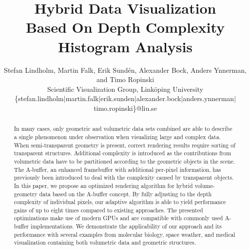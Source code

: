 \documentclass{egpubl}
\title[Hybrid Data Visualization]%
      {Hybrid Data Visualization\\ Based On Depth Complexity Histogram Analysis}
\author[S.~Lindholm et al.]%
{Stefan Lindholm, Martin Falk, Erik Sund\'en, Alexander Bock,
  Anders Ynnerman, and Timo Ropinski\\
  Scientific Visualization Group, Link{\"o}ping University\\
  \{stefan.lindholm$|$martin.falk$|$erik.sunden$|$alexander.bock$|$anders.ynnerman$|$timo.ropinski\}@liu.se%
}
\newcommand{\ab}{\mbox{A-buffer}}
\newlength{\imgWidth}
\newif\ifSplitBoxFramed
\newcommand{\splitImage}[2]{%
  \begin{tikzpicture}[x=\imgWidth,y=-\imgWidth] %
    \clip (0,0) rectangle (1,1);
    \begin{scope}[]
      \clip (0,0) -- (\topLineRatio,0) -- (\bottomLineRatio,1) -- (0,1);
      \draw(0,0) node[anchor=north west,inner sep=0pt]{%
        \texttt{[image: \#1]}};
    \end{scope}
    \begin{scope}[]
      \clip  (\topLineRatio,0) -- (\bottomLineRatio,1) -- (1,1) -- (1,0);
      \draw(0,0) node[anchor=north west,inner sep=0pt]{%
        \texttt{[image: \#2]}};
    \end{scope}
    \draw[black,very thick] (\topLineRatio,0) -- (\bottomLineRatio,1) ;
    \ifSplitBoxFramed%
      \draw[line width=1pt] (0,0) rectangle (1,1);
    \fi
  \end{tikzpicture}
}
\newcommand{\goldenRatioLong}{0.618}
\newcommand{\goldenRatioShort}{0.382}
\newcommand{\setSplitLineRatios}[2]{%
  \def\topLineRatio{#1}
  \def\bottomLineRatio{#2}
}
\begin{document}
\setSplitLineRatios{\goldenRatioLong}{\goldenRatioShort}


\maketitle

\begin{abstract}
%
In many cases, only geometric and volumetric data sets combined are able to describe a single phenomenon under observation when visualizing large and complex data.
When semi-transparent geometry is present, correct rendering results require sorting of transparent structures. 
Additional complexity is introduced as the contributions from volumetric data have to be partitioned according to the geometric objects in the scene.
The \ab{}, an enhanced framebuffer with additional per-pixel information, has previously been introduced to deal with the complexity caused by transparent objects. 
In this paper, we propose an optimized rendering algorithm for hybrid volume-geometry data based on the \ab{} concept. 
By fully adjusting to the depth complexity of individual pixels, our adaptive algorithm is able to yield performance gains of up to eight times compared to existing approaches. %
%
The presented optimizations make use of modern GPUs and are compatible with commonly used \ab{} implementations. 
We demonstrate the applicability of our approach and its performance with several examples from molecular biology, space weather, and medical visualization containing both volumetric data and geometric structures.

\begin{classification} %
\end{classification}

\end{abstract}
\end{document}
